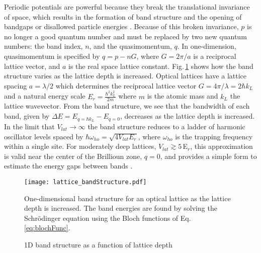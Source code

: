 Periodic potentials are powerful because they break the translational invariance of space, which results in the formation of band structure and the opening of bandgaps or disallowed particle energies \cite{Ashcroft1976}.
Because of this broken invariance, $p$ is no longer a good quantum number and must be replaced by two new quantum numbers: the band index, $n$, and the quasimomentum, $q$.
In one-dimension, quasimomentum is specified by $q = p - nG$, where $G=2\pi/a$ is a reciprocal lattice vector, and $a$ is the real space lattice constant.
Fig.\,\ref{fig:bandStructure} shows how the band structure varies as the lattice depth is increased.
Optical lattices have a lattice spacing $a = \lambda /2$ which determines the reciprocal lattice vector $G = 4\pi / \lambda = 2 \hbar k_L$ and a natural energy scale $E_r = \frac{\hbar^2 k_L^2}{2m}$ where $m$ is the atomic mass and $k_L$ the lattice wavevector.
From the band structure, we see that the bandwidth of each band, given by $\Delta E = E_{q=\hbar k_L} - E_{q=0}$, decreases as the lattice depth is increased.
In the limit that $V_{lat}\!\rightarrow\!\infty$ the band structure reduces to a ladder of harmonic oscillator levels spaced by $\hbar \omega_{ho} = \sqrt{4 V_{lat} E_r}$, where $\omega_{ho}$ is the trapping frequency within a single site.
For moderately deep lattices, $V_{lat} \gtrsim 5\,$E$_r$, this approximation is valid near the center of the Brillioun zone, $q = 0$, and provides a simple form to estimate the energy gaps between bands \cite{Jaksch2005, jbc98,Jaksch2005}.
	\begin{figure} 
		\centerline{
		\texttt{[image: lattice\_bandStructure.pdf]}}
		\caption{1D band structure as a function of lattice depth}{One-dimensional band structure for an optical lattice as the lattice depth is increased. The band energies are found by solving the Schr\"{o}dinger equation using the Bloch functions of Eq.\,\ref{eq:blochFunc}.}
		\label{fig:bandStructure}
	\end{figure}

